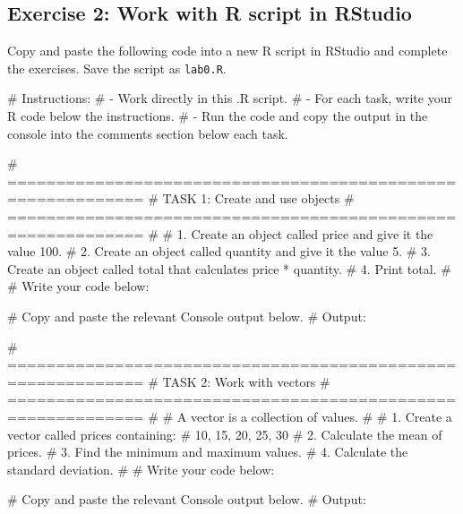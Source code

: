 \documentclass[
  12pt,
  a4paper,
]{scrbook}
\newenvironment{Shaded}{\begin{snugshade}}{\end{snugshade}}
\newcommand{\AlertTok}[1]{\textcolor[rgb]{0.68,0.00,0.00}{#1}}
\newcommand{\CommentTok}[1]{\textcolor[rgb]{0.37,0.37,0.37}{#1}}
\theoremstyle{plain}
\theoremstyle{definition}
\theoremstyle{remark}
\begin{document}
\subsection{Exercise 2: Work with R script in
RStudio}\label{exercise-2-work-with-r-script-in-rstudio}

Copy and paste the following code into a new R script in RStudio and
complete the exercises. Save the script as \texttt{lab0.R}.

\begin{Shaded}
\begin{Highlighting}[]
\CommentTok{\# Instructions:}
\CommentTok{\# {-} Work directly in this .R script.}
\CommentTok{\# {-} For each task, write your R code below the instructions.}
\CommentTok{\# {-} Run the code and copy the output in the console into the comments section below each task.}

\CommentTok{\# ============================================================}
\CommentTok{\# }\AlertTok{TASK}\CommentTok{ 1: Create and use objects}
\CommentTok{\# ============================================================}
\CommentTok{\#}
\CommentTok{\# 1. Create an object called \textasciigrave{}price\textasciigrave{} and give it the value 100.}
\CommentTok{\# 2. Create an object called \textasciigrave{}quantity\textasciigrave{} and give it the value 5.}
\CommentTok{\# 3. Create an object called \textasciigrave{}total\textasciigrave{} that calculates price * quantity.}
\CommentTok{\# 4. Print \textasciigrave{}total\textasciigrave{}.}
\CommentTok{\#}
\CommentTok{\# Write your code below:}


\CommentTok{\# Copy and paste the relevant Console output below.}
\CommentTok{\# Output:}


\CommentTok{\# ============================================================}
\CommentTok{\# }\AlertTok{TASK}\CommentTok{ 2: Work with vectors}
\CommentTok{\# ============================================================}
\CommentTok{\#}
\CommentTok{\# A vector is a collection of values.}
\CommentTok{\#}
\CommentTok{\# 1. Create a vector called \textasciigrave{}prices\textasciigrave{} containing:}
\CommentTok{\#    10, 15, 20, 25, 30}
\CommentTok{\# 2. Calculate the mean of \textasciigrave{}prices\textasciigrave{}.}
\CommentTok{\# 3. Find the minimum and maximum values.}
\CommentTok{\# 4. Calculate the standard deviation.}
\CommentTok{\#}
\CommentTok{\# Write your code below:}


\CommentTok{\# Copy and paste the relevant Console output below.}
\CommentTok{\# Output:}



\end{Highlighting}
\end{Shaded}
\end{document}
